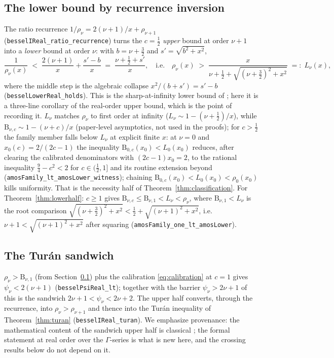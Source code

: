 \documentclass[11pt]{article}
\newcommand{\lean}[1]{\texttt{#1}}
\newcommand{\Bfam}{\mathrm{B}}
\begin{document}
\subsection{The lower bound by recurrence inversion}\label{sec:lower}

The ratio recurrence
$1/\rho_\nu = 2(\nu+1)/x + \rho_{\nu+1}$
(\lean{besselIReal\_ratio\_recurrence}) turns the $c=\tfrac12$
\emph{upper} bound at order $\nu+1$ into a \emph{lower} bound at
order $\nu$: with $b = \nu+\tfrac32$ and $s' = \sqrt{b^2+x^2}$,
\[
\frac{1}{\rho_\nu(x)} \;<\; \frac{2(\nu+1)}{x} + \frac{s'-b}{x}
\;=\; \frac{\nu+\tfrac12+s'}{x},
\quad\text{i.e.}\quad
\rho_\nu(x) \;>\; \frac{x}{\nu+\tfrac12+\sqrt{(\nu+\tfrac32)^2+x^2}}
\;=:\; L_\nu(x),
\]
where the middle step is the algebraic collapse
$x^2/(b+s') = s'-b$ (\lean{besselLowerReal\_holds}).  This is the
sharp-at-infinity lower bound of \cite{RS16}; here it is a
three-line corollary of the real-order upper bound, which is the
point of recording it.  $L_\nu$ matches $\rho_\nu$ to first order
at infinity ($L_\nu \sim 1 - (\nu+\tfrac12)/x$), while
$\Bfam_{\nu,c} \sim 1 - (\nu+c)/x$ (paper-level asymptotics, not
used in the proofs); for $c > \tfrac12$ the family
member falls below $L_\nu$ at explicit finite $x$: at $\nu = 0$ and
$x_0(c) = 2/(2c-1)$ the inequality
$\Bfam_{0,c}(x_0) < L_0(x_0)$ reduces, after clearing the
calibrated denominators with $(2c-1)x_0 = 2$, to the rational
inequality $\tfrac94 - c^2 < 2$ for $c \in (\tfrac12, 1]$ and its
routine extension beyond (\lean{amosFamily\_lt\_amosLower\_witness});
chaining $\Bfam_{0,c}(x_0) < L_0(x_0) < \rho_0(x_0)$ kills
uniformity.  That is the necessity half of
Theorem~\ref{thm:classification}.  For Theorem~\ref{thm:lowerhalf}:
$c \ge 1$ gives $\Bfam_{\nu,c} \le \Bfam_{\nu,1} < L_\nu < \rho_\nu$,
where $\Bfam_{\nu,1} < L_\nu$ is the root comparison
$\sqrt{(\nu+\tfrac32)^2+x^2} < \tfrac12 + \sqrt{(\nu+1)^2+x^2}$,
i.e.\ $\nu+1 < \sqrt{(\nu+1)^2+x^2}$ after squaring
(\lean{amosFamily\_one\_lt\_amosLower}).

\subsection{The Tur\'an sandwich}\label{sec:turan}

$\rho_\nu > \Bfam_{\nu,1}$ (from Section~\ref{sec:lower}) plus the
calibration \eqref{eq:calibration} at $c = 1$ gives
$\psi_\nu < 2(\nu+1)$ (\lean{besselPsiReal\_lt}); together with the
barrier $\psi_\nu > 2\nu+1$ of \cite{ErikssonC4} this is the
sandwich $2\nu+1 < \psi_\nu < 2\nu+2$.  The upper half converts,
through the recurrence, into $\rho_\nu > \rho_{\nu+1}$ and thence
into the Tur\'an inequality of Theorem~\ref{thm:turan}
(\lean{besselIReal\_turan}).  We emphasize provenance: the
mathematical content of the sandwich upper half is classical
\cite{BP13}; the formal statement at real order over the
$\Gamma$-series is what is new here, and the crossing results below
do not depend on it.
\end{document}
